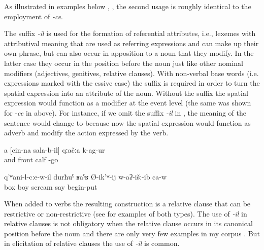 As illustrated in examples below , , the second usage is roughly identical to the employment of \textit{-ce}. 

The suffix \textit{-il} is used for the formation of referential attributes, i.e., lexemes with attributival meaning that are used as referring expressions and can make up their own phrase, but can also occur in apposition to a noun that they modify. In the latter case they occur in the position before the noun just like other nominal modifiers (adjectives, genitives, relative clauses). With non-verbal base words (i.e. expressions marked with the essive case) the suffix is required in order to turn the spatial expression into an attribute of the noun. Without the suffix the spatial expression would function as a modifier at the event level (the same was shown for -\textit{ce} in  above). For instance, if we omit the suffix \textit{-il} in , the meaning of the sentence would change to  because now the spatial expression would function as adverb and modify the action expressed by the verb.

\begin{exe}
	\ex	\label{ex:‎‎‎And the calf before him fell down minor}
	\gll	a	[cin-na	sala-b-il]	qːačːa	k-ag-ur\\
		and		front	calf	-go\\
	\glt	{}
	
	\ex	\label{ex:‎When he suspected, that he had left, the boy in the box started to scream minor}
	\gll	q'ʷani-l-cːe-w-il	durħuˁ	ʁaˁʁ	Ø-ik'ʷ-ij	w-aʔ-išː-ib	ca-w\\
		box	boy	scream	say	begin-put	\\
	\glt	{}
\end{exe}

When added to verbs the resulting construction is a relative clause that can be restrictive or non-restrictive (see  for examples of both types). The use of \textit{-il} in relative clauses is not obligatory  when the relative clause occurs in its canonical position before the noun and there are only very few examples in my corpus . But in elicitation of relative clauses the use of \textit{-il} is common. 

